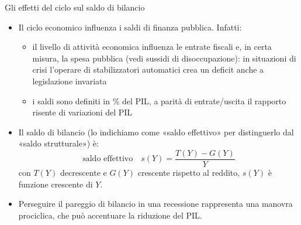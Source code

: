 \documentclass[aspectratio=64,11pt]{beamer}
\begin{document}
\begin{frame}{Gli effetti del ciclo sul saldo di bilancio}

  \begin{itemize}
  \item Il ciclo economico influenza i saldi di finanza pubblica. Infatti:
    \begin{itemize}
    \item il livello di attività economica influenza le entrate fiscali e, in
      certa misura, la spesa pubblica (vedi sussidi di disoccupazione): in
      situazioni di crisi l'operare di \alert{stabilizzatori automatici} crea
      un deficit anche a legislazione invariata
    \item i saldi sono definiti in \% del PIL, a parità di entrate/uscita il
      rapporto risente di variazioni del PIL
    \end{itemize}
  \item Il saldo di bilancio (lo indichiamo come «saldo effettivo» per
    distinguerlo dal «saldo strutturale») è:
    \begin{equation*}
      \text{saldo effettivo}\quad s(Y)=\frac{T(Y)-G(Y)}{Y}
    \end{equation*}
    con $T(Y)$ decrescente e $G(Y)$ crescente rispetto al reddito, $s(Y)$ è
    funzione crescente di $Y$.
  \item Perseguire il pareggio di bilancio in una recessione rappresenta una manovra
    \alert{prociclica}, che può accentuare la riduzione del PIL.
  \end{itemize}
\end{frame}
\end{document}
